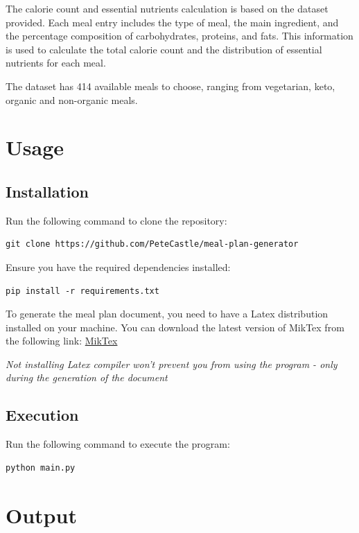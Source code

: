 \documentclass{article}
\begin{document}
The calorie count and essential nutrients calculation is based on the dataset provided. Each meal entry includes the type of meal, the main ingredient, and the percentage composition of carbohydrates, proteins, and fats. This information is used to calculate the total calorie count and the distribution of essential nutrients for each meal.

The dataset has 414 available meals to choose, ranging from vegetarian, keto, organic and non-organic meals.

\section{Usage}
\subsection{Installation}
Run the following command to clone the repository:

\begin{verbatim}
git clone https://github.com/PeteCastle/meal-plan-generator
\end{verbatim}

Ensure you have the required dependencies installed:

\begin{verbatim}
pip install -r requirements.txt
\end{verbatim}

To generate the meal plan document, you need to have a Latex distribution installed on your machine. You can download the latest version of MikTex from the following link: \href{https://miktex.org/download}{MikTex}

\textit{Not installing Latex compiler won't prevent you from using the program - only during the generation of the document}

\subsection{Execution}
Run the following command to execute the program:

\begin{verbatim}
python main.py
\end{verbatim}

\section{Output}
\end{document}
